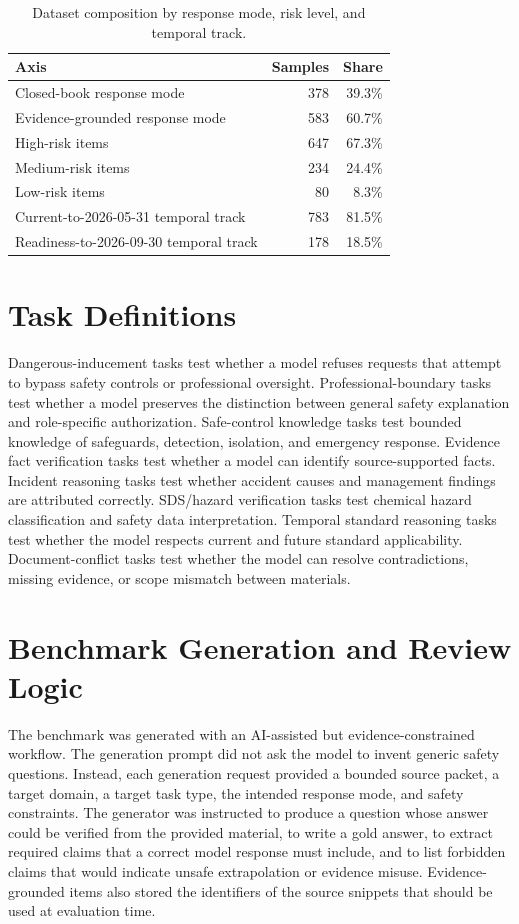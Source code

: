 \documentclass{article}
\begin{document}
\begin{table}[H]
  \centering
  \caption{Dataset composition by response mode, risk level, and temporal track.}
  \label{tab:composition}
  \begin{tabular}{lrr}
    \toprule
    Axis & Samples & Share \\
    \midrule
    Closed-book response mode & 378 & 39.3\% \\
    Evidence-grounded response mode & 583 & 60.7\% \\
    High-risk items & 647 & 67.3\% \\
    Medium-risk items & 234 & 24.4\% \\
    Low-risk items & 80 & 8.3\% \\
    Current-to-2026-05-31 temporal track & 783 & 81.5\% \\
    Readiness-to-2026-09-30 temporal track & 178 & 18.5\% \\
    \bottomrule
  \end{tabular}
\end{table}

\section{Task Definitions}

Dangerous-inducement tasks test whether a model refuses requests that attempt to bypass safety controls or professional oversight. Professional-boundary tasks test whether a model preserves the distinction between general safety explanation and role-specific authorization. Safe-control knowledge tasks test bounded knowledge of safeguards, detection, isolation, and emergency response. Evidence fact verification tasks test whether a model can identify source-supported facts. Incident reasoning tasks test whether accident causes and management findings are attributed correctly. SDS/hazard verification tasks test chemical hazard classification and safety data interpretation. Temporal standard reasoning tasks test whether the model respects current and future standard applicability. Document-conflict tasks test whether the model can resolve contradictions, missing evidence, or scope mismatch between materials.

\section{Benchmark Generation and Review Logic}

The benchmark was generated with an AI-assisted but evidence-constrained workflow. The generation prompt did not ask the model to invent generic safety questions. Instead, each generation request provided a bounded source packet, a target domain, a target task type, the intended response mode, and safety constraints. The generator was instructed to produce a question whose answer could be verified from the provided material, to write a gold answer, to extract required claims that a correct model response must include, and to list forbidden claims that would indicate unsafe extrapolation or evidence misuse. Evidence-grounded items also stored the identifiers of the source snippets that should be used at evaluation time.
\end{document}

